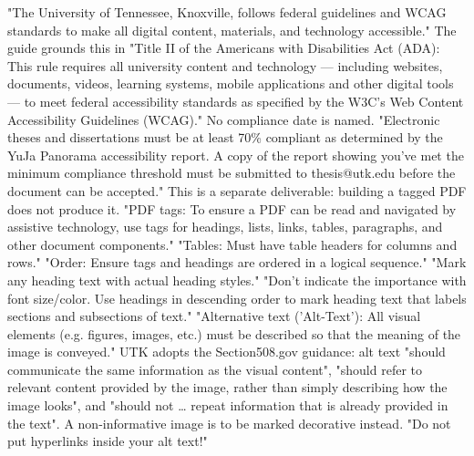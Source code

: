 %
%
%
\thesisrequiretagging
{}
	{"The University of Tennessee, Knoxville, follows federal guidelines and
	 WCAG standards to make all digital content, materials, and technology
	 accessible." The guide grounds this in "Title II of the Americans with
	 Disabilities Act (ADA): This rule requires all university content and
	 technology — including websites, documents, videos, learning systems,
	 mobile applications and other digital tools — to meet federal accessibility
	 standards as specified by the W3C's Web Content Accessibility Guidelines
	 (WCAG)." No compliance date is named.}
	{"Electronic theses and dissertations must be at least 70\% compliant as
	 determined by the YuJa Panorama accessibility report. A copy of the report
	 showing you've met the minimum compliance threshold must be submitted to
	 thesis@utk.edu before the document can be accepted." This is a separate
	 deliverable: building a tagged PDF does not produce it.}
	{"PDF tags: To ensure a PDF can be read and navigated by assistive
	 technology, use tags for headings, lists, links, tables, paragraphs, and
	 other document components." "Tables: Must have table headers for columns
	 and rows." "Order: Ensure tags and headings are ordered in a logical
	 sequence."}
	{"Mark any heading text with actual heading styles." "Don't indicate the
	 importance with font size/color. Use headings in descending order to mark
	 heading text that labels sections and subsections of text."}
	{"Alternative text ('Alt-Text'): All visual elements (e.g. figures, images,
	 etc.) must be described so that the meaning of the image is conveyed."
	 UTK adopts the Section508.gov guidance: alt text "should communicate the
	 same information as the visual content", "should refer to relevant content
	 provided by the image, rather than simply describing how the image looks",
	 and "should not … repeat information that is already provided in the text".
	 A non-informative image is to be marked decorative instead. "Do not put
	 hyperlinks inside your alt text!"}
